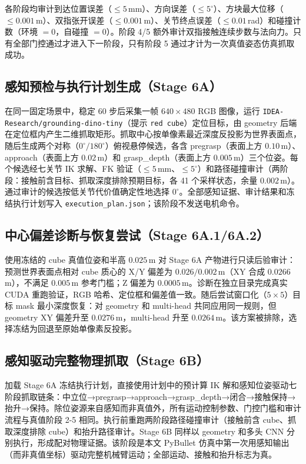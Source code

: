 \documentclass{l4proj}
\begin{document}
各阶段均审计到达位置误差（$\leq 5$\,mm）、方向误差（$\leq 5^\circ$）、方块最大位移（$\leq 0.001$\,m）、双指张开误差（$\leq 0.001$\,m）、关节终点误差（$\leq 0.01$\,rad）和碰撞计数（环境 $=0$，自碰撞 $=0$）。阶段 4/5 额外审计双指接触连续步数与法向力。只有全部门控通过才进入下一阶段，只有阶段 5 通过才计为一次真值姿态仿真抓取成功。

\subsection{感知预检与执行计划生成（Stage 6A）}
在同一固定场景中，稳定 60 步后采集一帧 $640\times480$ RGB 图像，运行 \texttt{IDEA-Research/grounding-dino-tiny}（提示 \texttt{red cube}）定位目标，由 geometry 后端在定位框内产生二维抓取矩形。抓取中心按单像素最近深度反投影为世界表面点，随后生成两个对称（$0^\circ/180^\circ$）俯视悬停候选，各含 pregrasp（表面上方 $0.10$\,m）、approach（表面上方 $0.02$\,m）和 grasp\_depth（表面上方 $0.005$\,m）三个位姿。每个候选经七关节 IK 求解、FK 验证（$\leq 5$\,mm、$\leq 5^\circ$）和路径碰撞审计（两阶段：接触前含目标、抓取深度排除预期目标，各 41 个采样状态，余量 $0.002$\,m）。通过审计的候选按低关节代价值确定性地选择 $0^\circ$。全部感知证据、审计结果和冻结执行计划写入 \texttt{execution\_plan.json}；该阶段不发送电机命令。

\subsection{中心偏差诊断与恢复尝试（Stage 6A.1/6A.2）}
使用冻结的 cube 真值位姿和半高 $0.025$\,m 对 Stage 6A 产物进行只读后验审计：预测世界表面点相对 cube 质心的 X/Y 偏差为 $0.026/0.002$\,m（XY 合成 $0.0266$\,m），不满足 $0.005$\,m 参考门槛；Z 偏差为 $0.0005$\,m。诊断在独立目录完成真实 CUDA 重跑验证，RGB 哈希、定位框和偏差值一致。随后尝试窗口化（$5\times5$）目标 mask 最小深度恢复：对 geometry 和 multi-head 共同应用同一规则，但 geometry XY 偏差升至 $0.0276$\,m，multi-head 升至 $0.0264$\,m。该方案被排除，选择冻结为回退至原始单像素反投影。

\subsection{感知驱动完整物理抓取（Stage 6B）}
加载 Stage 6A 冻结执行计划，直接使用计划中的预计算 IK 解和感知位姿驱动七阶段抓取链条：中立位→pregrasp→approach→grasp\_depth→闭合→接触保持→抬升→保持。除位姿源来自感知而非真值外，所有运动控制参数、门控门槛和审计流程与真值阶段 2-5 相同。执行前重跑两阶段路径碰撞审计（接触前含 cube、抓取深度排除 cube）和抬升路径审计。Stage 6B 同样以 geometry 和多头 CNN 分别执行，形成配对物理证据。该阶段是本文 PyBullet 仿真中第一次用感知输出（而非真值坐标）驱动完整机械臂运动；全部运动、接触和抬升标志为真。
\end{document}
